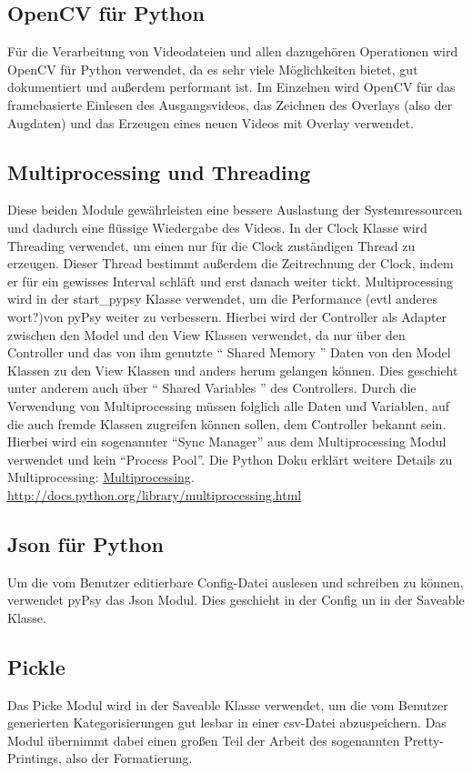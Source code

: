 \documentclass[a4paper,draft]{scrartcl}
\begin{document}
\subsection{OpenCV für Python}
Für die Verarbeitung von Videodateien und allen dazugehören Operationen wird OpenCV für Python verwendet, da es sehr viele Möglichkeiten bietet, gut dokumentiert und außerdem performant ist. 
Im Einzelnen wird OpenCV für das framebasierte Einlesen des Ausgangsvideos, das Zeichnen des Overlays (also der Augdaten) und das Erzeugen eines neuen Videos mit Overlay verwendet.
\subsection{Multiprocessing und Threading}
Diese beiden Module gewährleisten eine bessere Auslastung der Systemressourcen und dadurch eine flüssige Wiedergabe des Videos. 
In der Clock Klasse wird Threading verwendet, um einen nur für die Clock zuständigen Thread zu erzeugen. Dieser Thread bestimmt außerdem die Zeitrechnung der Clock, indem er für ein gewisses Interval schläft und erst danach weiter tickt. 
Multiprocessing wird in der start\_pypsy Klasse verwendet, um die Performance (evtl anderes wort?)von pyPsy weiter zu verbessern. Hierbei wird der Controller als Adapter zwischen den Model und den View Klassen verwendet, da nur über den Controller und das von ihm genutzte "` Shared Memory "' Daten von den Model Klassen zu den View Klassen und anders herum gelangen können. Dies geschieht unter anderem auch über "` Shared Variables "' des Controllers. 
Durch die Verwendung von Multiprocessing müssen folglich alle Daten und Variablen, auf die auch fremde Klassen zugreifen können sollen, dem Controller bekannt sein. Hierbei wird ein sogenannter "`Sync Manager"' aus dem Multiprocessing Modul verwendet und kein "`Process Pool"'.
Die Python Doku erklärt weitere Details zu Multiprocessing: \href{http://docs.python.org/library/multiprocessing.html}
{Multiprocessing}.
\url{http://docs.python.org/library/multiprocessing.html}
\subsection{Json für Python}
Um die vom Benutzer editierbare Config-Datei auslesen und schreiben zu können, verwendet pyPsy das Json Modul. Dies geschieht in der Config un in der Saveable Klasse. 

\subsection{Pickle}
Das Picke Modul wird in der Saveable Klasse verwendet, um die vom Benutzer generierten Kategorisierungen gut lesbar in einer csv-Datei abzuspeichern. Das Modul übernimmt dabei einen großen Teil der Arbeit des sogenannten Pretty-Printings, also der Formatierung.
\end{document}
